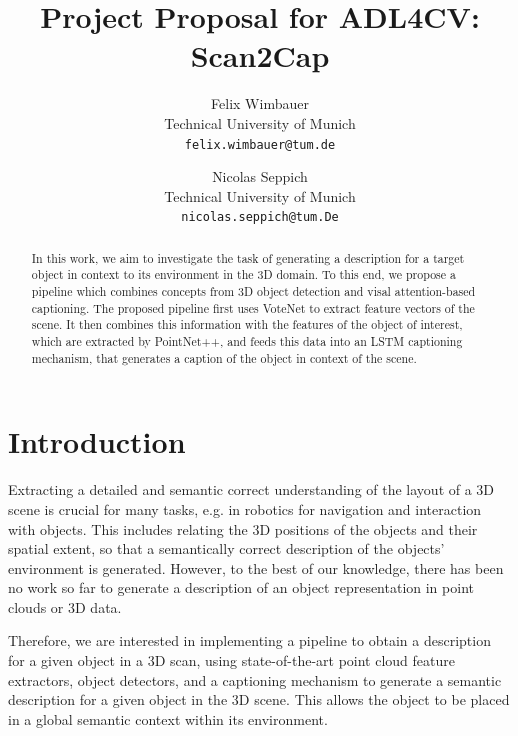 \documentclass[10pt,twocolumn,letterpaper]{article}
\begin{document}
\title{Project Proposal for ADL4CV: Scan2Cap}

\author{Felix Wimbauer\\
Technical University of Munich\\
{\tt\small felix.wimbauer@tum.de}
\and
Nicolas Seppich\\
Technical University of Munich\\
{\tt\small nicolas.seppich@tum.De}
}

\maketitle

\begin{abstract}
	In this work, we aim to investigate the task of generating a description for a target object in context to its environment in the 3D domain. To this end, we propose a pipeline which combines concepts from 3D object detection and visal attention-based captioning. The proposed pipeline first uses VoteNet to extract feature vectors of the scene. It then combines this information with the features of the object of interest, which are extracted by PointNet++, and feeds this data into an LSTM captioning mechanism, that generates a caption of the object in context of the scene.  
   
\end{abstract}

\section{Introduction}

Extracting a detailed and semantic correct understanding of the layout of a 3D scene is crucial for many tasks, e.g. in robotics for navigation and interaction with objects. This includes relating the 3D positions of the objects and their spatial extent, so that a semantically correct description of the objects' environment is generated.
However, to the best of our knowledge, there has been no work so far to generate a description of an object representation in point clouds or 3D data.

Therefore, we are interested in implementing a pipeline to obtain a description for a given object in a 3D scan, using state-of-the-art point cloud feature extractors, object detectors, and a captioning mechanism to generate a semantic description for a given object in the 3D scene. This allows the object to be placed in a global semantic context within its environment.
 
\end{document}
